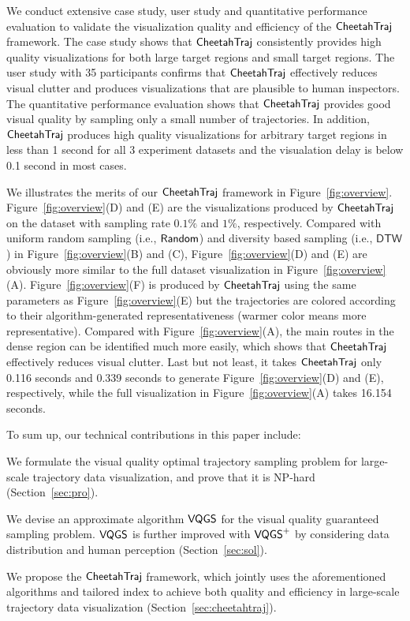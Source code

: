 We conduct extensive case study, user study and quantitative performance evaluation to validate the visualization quality and efficiency of the $\mathsf{CheetahTraj}$ framework. The case study shows that $\mathsf{CheetahTraj}$ consistently provides high quality visualizations for both large target regions and small target regions. The user study with 35 participants confirms that $\mathsf{CheetahTraj}$ effectively reduces visual clutter and produces visualizations that are plausible to human inspectors. The quantitative performance evaluation shows that $\mathsf{CheetahTraj}$ provides good visual quality by sampling only a small number of trajectories. In addition,  $\mathsf{CheetahTraj}$ produces high quality visualizations for arbitrary target regions in less than 1 second for all 3 experiment datasets and the visualation delay is below 0.1 second in most cases.


We illustrates the merits of our $\mathsf{CheetahTraj}$ framework in Figure~\ref{fig:overview}. Figure~\ref{fig:overview}(D) and (E) are the visualizations produced by $\mathsf{CheetahTraj}{}$ on the \pt{} dataset with sampling rate $0.1\%$ and $1\%$, respectively. Compared with uniform random sampling (i.e., $\mathsf{Random}$) and diversity based sampling (i.e., $\mathsf{DTW}$) in Figure~\ref{fig:overview}(B) and (C), Figure~\ref{fig:overview}(D) and (E) are obviously more similar to the full dataset visualization in Figure~\ref{fig:overview}(A).
Figure~\ref{fig:overview}(F) is produced by $\mathsf{CheetahTraj}{}$ using the same parameters as Figure~\ref{fig:overview}(E) but the trajectories are colored according to their algorithm-generated representativeness (warmer color means more representative). Compared with Figure~\ref{fig:overview}(A), the main routes in the dense region can be identified much more easily, which shows that $\mathsf{CheetahTraj}{}$ effectively reduces visual clutter. Last but not least, it takes $\mathsf{CheetahTraj}{}$ only 0.116 seconds and 0.339 seconds to generate Figure~\ref{fig:overview}(D) and (E), respectively, while the full visualization in Figure~\ref{fig:overview}(A) takes 16.154 seconds.



To sum up, our technical contributions in this paper include:

\squishlist
  \item We formulate the visual quality optimal trajectory sampling problem for large-scale trajectory data visualization, and prove that it is {NP-hard} (Section~\ref{sec:pro}).
  \item We devise an approximate algorithm $\mathsf{VQGS}$ for the visual quality guaranteed sampling problem. $\mathsf{VQGS}$ is further improved with $\mathsf{VQGS}^+$ by considering data distribution and human perception (Section~\ref{sec:sol}).
  \item We propose the $\mathsf{CheetahTraj}$ framework, which jointly uses the aforementioned algorithms and tailored index to achieve both quality and efficiency in large-scale trajectory data visualization (Section~\ref{sec:cheetahtraj}).

